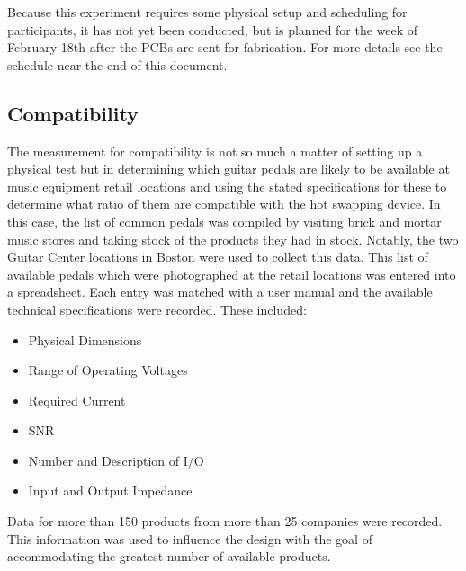 \documentclass{article}
\begin{document}
	Because this experiment requires some physical setup and scheduling for participants, it has not yet been conducted, but is planned for the week of February 18th after the PCBs are sent for fabrication.  For more details see the schedule near the end of this document.

	\subsection{Compatibility}
	The measurement for compatibility is not so much a matter of setting up a physical test but in determining which guitar pedals are likely to be available at music equipment retail locations and using the stated specifications for these to determine what ratio of them are compatible with the hot swapping device.  In this case, the list of common pedals was compiled by visiting brick and mortar music stores and taking stock of the products they had in stock.  Notably, the two Guitar Center locations in Boston were used to collect this data.  This list of available pedals which were photographed at the retail locations was entered into a spreadsheet.  Each entry was matched with a user manual and the available technical specifications were recorded.  These included:

	\begin{itemize}
		\item Physical Dimensions
		\item Range of Operating Voltages
		\item Required Current
		\item SNR
		\item Number and Description of I/O
		\item Input and Output Impedance
	\end{itemize}

	Data for more than 150 products from more than 25 companies were recorded.  This information was used to influence the design with the goal of accommodating the greatest number of available products.
\end{document}
